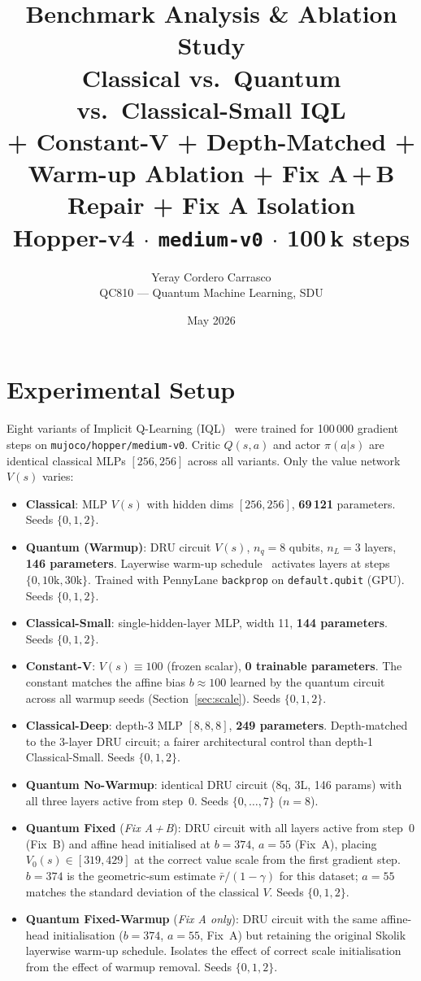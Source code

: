 \documentclass[10pt,a4paper]{article}
\title{\textbf{Benchmark Analysis \& Ablation Study}\\[2pt]
  \large Classical vs.\ Quantum vs.\ Classical-Small IQL\\
  + Constant-V + Depth-Matched + Warm-up Ablation
  + Fix A\,+\,B Repair + Fix A Isolation\\
  Hopper-v4 $\cdot$ \texttt{medium-v0} $\cdot$ 100\,k steps}
\author{Yeray Cordero Carrasco \\ QC810 --- Quantum Machine Learning, SDU}
\date{May 2026}
\begin{document}
\maketitle
\thispagestyle{empty}

\section{Experimental Setup}

Eight variants of Implicit Q-Learning (IQL)~\cite{kostrikov2021} were trained
for 100\,000 gradient steps on \texttt{mujoco/hopper/medium-v0}.
Critic $Q(s,a)$ and actor $\pi(a|s)$ are identical classical MLPs $[256,256]$
across all variants. Only the value network $V(s)$ varies:

\begin{itemize}
  \item \textbf{Classical}: MLP $V(s)$ with hidden dims $[256,256]$,
        \textbf{69\,121} parameters. Seeds $\{0,1,2\}$.
  \item \textbf{Quantum (Warmup)}: DRU circuit $V(s)$, $n_q=8$ qubits,
        $n_L=3$ layers, \textbf{146 parameters}. Layerwise warm-up
        schedule~\cite{skolik2021} activates layers at steps
        $\{0,10\text{k},30\text{k}\}$. Trained with PennyLane
        \texttt{backprop} on \texttt{default.qubit} (GPU).
        Seeds $\{0,1,2\}$.
  \item \textbf{Classical-Small}: single-hidden-layer MLP, width 11,
        \textbf{144 parameters}. Seeds $\{0,1,2\}$.
  \item \textbf{Constant-V}: $V(s)\equiv100$ (frozen scalar),
        \textbf{0 trainable parameters}. The constant matches the affine
        bias $b\approx100$ learned by the quantum circuit across all
        warmup seeds (Section~\ref{sec:scale}). Seeds $\{0,1,2\}$.
  \item \textbf{Classical-Deep}: depth-3 MLP $[8,8,8]$, \textbf{249
        parameters}. Depth-matched to the 3-layer DRU circuit; a fairer
        architectural control than depth-1 Classical-Small.
        Seeds $\{0,1,2\}$.
  \item \textbf{Quantum No-Warmup}: identical DRU circuit (8q, 3L, 146
        params) with all three layers active from step~0.
        Seeds $\{0,\ldots,7\}$ ($n=8$).
  \item \textbf{Quantum Fixed} (\emph{Fix A\,+\,B}): DRU circuit with all
        layers active from step~0 (Fix~B) and affine head initialised at
        $b=374$, $a=55$ (Fix~A), placing $V_0(s)\in[319,429]$ at the
        correct value scale from the first gradient step. $b=374$ is the
        geometric-sum estimate $\bar{r}/(1-\gamma)$ for this dataset;
        $a=55$ matches the standard deviation of the classical $V$.
        Seeds $\{0,1,2\}$.
  \item \textbf{Quantum Fixed-Warmup} (\emph{Fix A only}): DRU circuit
        with the same affine-head initialisation ($b=374$, $a=55$,
        Fix~A) but retaining the original Skolik layerwise warm-up
        schedule. Isolates the effect of correct scale initialisation
        from the effect of warmup removal. Seeds $\{0,1,2\}$.
\end{itemize}
\end{document}
